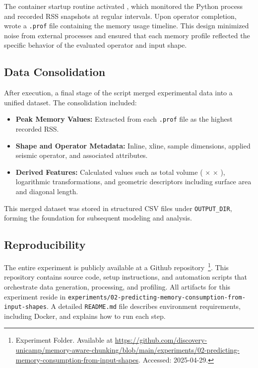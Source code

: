 The container startup routine activated \traceq, which monitored the Python process and recorded \ac{RSS} snapshots at regular intervals.
Upon operator completion, \traceq wrote a \texttt{.prof} file containing the memory usage timeline.
This design minimized noise from external processes and ensured that each memory profile reflected the specific behavior of the evaluated operator and input shape.

\subsection{Data Consolidation}
\label{subsec:data-consolidation}

After execution, a final stage of the script merged experimental data into a unified dataset.
The consolidation included:

\begin{itemize}
    \item \textbf{Peak Memory Values:} Extracted from each \texttt{.prof} file as the highest recorded \ac{RSS}.
    \item \textbf{Shape and Operator Metadata:} Inline, xline, sample dimensions, applied seismic operator, and associated attributes.
    \item \textbf{Derived Features:} Calculated values such as total volume ( $\times$  $\times$ ), logarithmic transformations, and geometric descriptors including surface area and diagonal length.
\end{itemize}

This merged dataset was stored in structured \ac{CSV} files under \texttt{OUTPUT\_DIR}, forming the foundation for subsequent modeling and analysis.

\subsection{Reproducibility}
\label{subsec:reproducibility}

The entire experiment is publicly available at a Github repository~\footnote{Experiment Folder. Available at \url{https://github.com/discovery-unicamp/memory-aware-chunking/blob/main/experiments/02-predicting-memory-consumption-from-input-shapes}. Accessed: 2025-04-29.}.
This repository contains source code, setup instructions, and automation scripts that orchestrate data generation, processing, and profiling.
All artifacts for this experiment reside in \texttt{experiments/02-predicting-memory-consumption-from-input-shapes}.
A detailed \texttt{README.md} file describes environment requirements, including Docker, and explains how to run each step.

